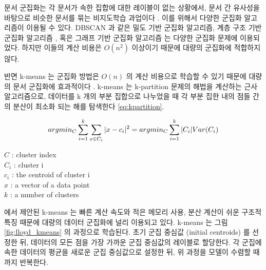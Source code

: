 \documentclass[oneside, ko,phd]{snuthesis_utf8_kor}
\begin{document}
문서 군집화는 각 문서가 속한 집합에 대한 레이블이 없는 상황에서, 문서 간 유사성을 바탕으로 비슷한 문서를 묶는 비지도학습 과업이다 \cite{xu2015comprehensive, yang2017towards, xie2016unsupervised}.
이를 위해서 다양한 군집화 알고리즘이 이용될 수 있다.
DBSCAN \cite{ester1996density}과 같은 밀도 기반 군집화 알고리즘, 계층 구조 기반 군집화 알고리즘 \cite{sibson1973slink}, 혹은 그래프 기반 군집화 알고리즘 \cite{clauset2004finding} 는 다양한 군집화 문제에 이용되었다.
하지만 이들의 계산 비용은 $O(n^2)$ 이상이기 때문에 대량의 군집화에 적합하지 않다.

반면 k-means 는 군집화 방법은 $O(n)$ 의 계산 비용으로 학습할 수 있기 때문에 대량의 문서 군집화에 효과적이다 \cite{coates2012learning, he2013k, jin2013density, coates2011analysis}.
k-means 는 k-partition 문제의 해법을 계산하는 근사 알고리즘으로, 데이터를 k 개의 부분 집합으로 나누었을 때 각 부분 집한 내의 점들 간의 분산이 최소화 되는 해를 탐색한다 \ref{eq:kpartition}.

\begin{equation}
\label{eq:kpartition}
\centering
arg min_C\sum_{i=1}^{k} \sum_{x \in C_i} \vert x - c_i \vert^2 = arg min_C \sum_{i=1}^{k} \vert C_i \vert Var(C_i)
\end{equation}

\begin{flushleft}
$C$ : cluster index\\
$C_i$ : cluster i\\
$c_i$ : the centroid of cluster i\\
$x$ : a vector of a data point\\
$k$ : a number of clusters\\
\end{flushleft}

\cite{lloyd1982least} 에서 제안된 k-means 는 빠른 계산 속도와 적은 메모리 사용, 분산 계산이 쉬운 구조적 특징 때문에 대량의 데이터 군집화에 널리 이용되고 있다.
k-means 는 그림 \ref{fig:lloyd_kmeans} 의 과정으로 학습된다.
초기 군집 중심값 (initial centroids) 를 선정한 뒤, 데이터의 모든 점을 가장 가까운 군집 중심값의 레이블로 할당한다.
각 군집에 속한 데이터의 평균을 새로운 군집 중심값으로 설정한 뒤, 위 과정을 모델이 수렴할 때까지 반복한다.
\end{document}
